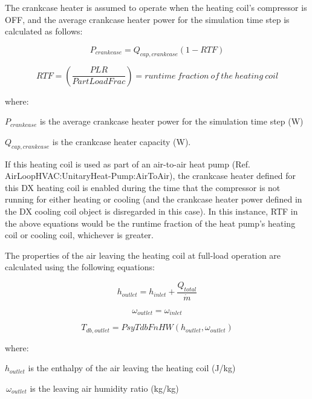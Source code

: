 The crankcase heater is assumed to operate when the heating coil's compressor is OFF, and the average crankcase heater power for the simulation time step is calculated as follows:

\begin{equation}
  {P_{crankcase}} = {Q_{cap,crankcase}}\left( {1 - RTF} \right)
\end{equation}

\begin{equation}
RTF = \left( \frac{PLR}{PartLoadFrac} \right) = runtime~fraction~of~the~heating~coil
\end{equation}

where:

\({P_{crankcase}}\) is the average crankcase heater power for the simulation time step (W)

\({Q_{cap,crankcase}}\) is the crankcase heater capacity (W).

If this heating coil is used as part of an air-to-air heat pump (Ref. AirLoopHVAC:UnitaryHeat-Pump:AirToAir), the crankcase heater defined for this DX heating coil is enabled during the time that the compressor is not running for either heating or cooling (and the crankcase heater power defined in the DX cooling coil object is disregarded in this case). In this instance, RTF in the above equations would be the runtime fraction of the heat pump's heating coil or cooling coil, whichever is greater.

The properties of the air leaving the heating coil at full-load operation are calculated using the following equations:

\begin{equation}
  h_{outlet} = h_{inlet} + \frac{Q_{total}}{\dot{m}}
 \label{eq:SSEHPDXHeatingCoilhoutlet}
\end{equation}

\begin{equation}
{\omega_{outlet}} = {\omega_{inlet}}
\label{eq:SSEHPDXHeatingCoilomegaoutlet}
\end{equation}

\begin{equation}
{T_{db,outlet}} = PsyTdbFnHW({h_{outlet}},{\omega_{outlet}})
\label{eq:SSEHPDXHeatingCoilTdboutlet}
\end{equation}

where:

\({h_{outlet}}\) is the enthalpy of the air leaving the heating coil (J/kg)

\(\,{\omega_{outlet}}\) is the leaving air humidity ratio (kg/kg)

